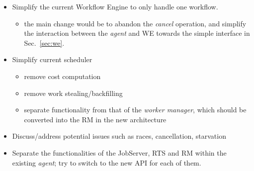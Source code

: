 \documentclass[10pt]{article}
\newcommand{\rts}{RTS\xspace}
\newcommand{\rman}{RM\xspace}
\newcommand{\we}{WE\xspace}
\begin{document}
\begin{itemize}
    \item Simplify the current Workflow Engine to only handle one workflow.
    \begin{itemize}
        \item the main change would be to abandon the \emph{cancel} operation,
        and simplify the interaction between the \emph{agent} and \we towards the simple
        interface in Sec.~\ref{sec:we}.
    \end{itemize}
    \item Simplify current scheduler
    \begin{itemize}
        \item remove cost computation
        \item remove work stealing/backfilling 
        \item separate functionality from that of the \emph{worker manager},
        which should be converted into the \rman in the new architecture
    \end{itemize}     
    
    \item Discuss/address potential issues such as races, cancellation, 
    starvation
    
    \item Separate the functionalities of the JobServer, \rts and \rman within
    the existing \emph{agent}; try to switch to the new API for each of them.
\end{itemize}
\end{document}
